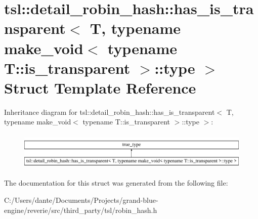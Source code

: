 \hypertarget{structtsl_1_1detail__robin__hash_1_1has__is__transparent_3_01_t_00_01typename_01make__void_3_01t93b498814c1f5bee35be5201b3be4555}{}\section{tsl\+::detail\+\_\+robin\+\_\+hash\+::has\+\_\+is\+\_\+transparent$<$ T, typename make\+\_\+void$<$ typename T\+::is\+\_\+transparent $>$\+::type $>$ Struct Template Reference}
\label{structtsl_1_1detail__robin__hash_1_1has__is__transparent_3_01_t_00_01typename_01make__void_3_01t93b498814c1f5bee35be5201b3be4555}
Inheritance diagram for tsl\+::detail\+\_\+robin\+\_\+hash\+::has\+\_\+is\+\_\+transparent$<$ T, typename make\+\_\+void$<$ typename T\+::is\+\_\+transparent $>$\+::type $>$\+:\begin{figure}[H]
\begin{center}
\leavevmode
\includegraphics[height=1.818182cm]{structtsl_1_1detail__robin__hash_1_1has__is__transparent_3_01_t_00_01typename_01make__void_3_01t93b498814c1f5bee35be5201b3be4555}
\end{center}
\end{figure}


The documentation for this struct was generated from the following file\+:\begin{DoxyCompactItemize}
\item 
C\+:/\+Users/dante/\+Documents/\+Projects/grand-\/blue-\/engine/reverie/src/third\+\_\+party/tsl/robin\+\_\+hash.\+h\end{DoxyCompactItemize}
